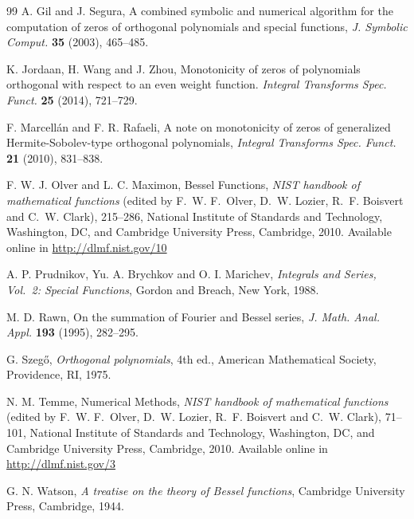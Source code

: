 \documentclass[10pt,a4paper]{article}
\numberwithin{equation}{section}
\theoremstyle{plain}
\theoremstyle{definition}
\begin{document}
\begin{thebibliography}{99}
A. Gil and J. Segura,
A combined symbolic and numerical algorithm for the computation of zeros of orthogonal polynomials and special functions,
\textit{J. Symbolic Comput.}
\textbf{35} (2003), 465--485.

K. Jordaan, H. Wang and J. Zhou,
Monotonicity of zeros of polynomials orthogonal with respect to an even weight function.
\textit{Integral Transforms Spec. Funct.}
\textbf{25} (2014), 721--729.

F. Marcell\'an and F. R. Rafaeli,
A note on monotonicity of zeros of generalized Hermite-Sobolev-type orthogonal polynomials,
\textit{Integral Transforms Spec. Funct.}
\textbf{21} (2010), 831--838.

F. W. J. Olver and L. C. Maximon,
Bessel Functions,
\textit{NIST handbook of mathematical functions}
(edited by F.~W. F.~Olver, D.~W. Lozier, R.~F. Boisvert and C.~W. Clark),
215--286, %
National Institute of Standards and Technology, Washington, DC, and
Cambridge University Press, Cambridge, 2010.
Available online in \url{http://dlmf.nist.gov/10}

A. P. Prudnikov, Yu. A. Brychkov and O. I. Marichev,
\textit{Integrals and Series, Vol.~2: Special Functions},
Gordon and Breach, New York, 1988.

M. D. Rawn,
On the summation of Fourier and Bessel series,
\textit{J. Math. Anal. Appl.}
\textbf{193} (1995), 282--295.

G. Szeg\H{o},
\textit{Orthogonal polynomials}, 4th ed.,
American Mathematical Society, Providence, RI, 1975.

N. M. Temme,
Numerical Methods,
\textit{NIST handbook of mathematical functions}
(edited by F.~W. F.~Olver, D.~W. Lozier, R.~F. Boisvert and C.~W. Clark),
71--101, %
National Institute of Standards and Technology, Washington, DC, and
Cambridge University Press, Cambridge, 2010.
Available online in \url{http://dlmf.nist.gov/3}

G. N. Watson,
\textit{A treatise on the theory of Bessel functions},
Cambridge University Press, Cambridge, 1944.

\end{thebibliography}

\end{document}
